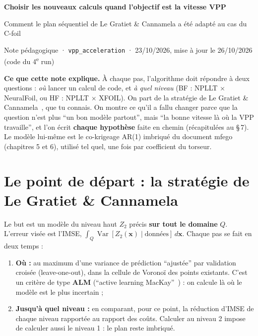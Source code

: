 \documentclass[11pt,a4paper]{article}
\newcommand{\vx}{\bm{x}}
\newcommand{\py}[1]{\texttt{#1}}
\DeclareMathOperator{\Var}{Var}
\begin{document}
{\centering
{\Large\bfseries\color{blue!40!black} Choisir les nouveaux calculs quand l'objectif est la vitesse VPP\par}
\vspace{0.15em}
{\large Comment le plan séquentiel de Le Gratiet \& Cannamela a été adapté au cas du C-foil\par}
\vspace{0.2em}
{\small Note pédagogique · \py{vpp\_acceleration} · 23/10/2026, mise à jour le 26/10/2026 (code du 4\textsuperscript{e} run)\par}}

\vspace{0.4em}
\textbf{Ce que cette note explique.} À chaque pas, l'algorithme doit répondre à deux questions : \emph{où}
lancer un calcul de code, et \emph{à quel niveau} (BF : NPLLT × NeuralFoil, ou HF : NPLLT × XFOIL). On
part de la stratégie de Le Gratiet \& Cannamela~\cite{LGC15}, que tu connais. On montre ce qu'il a fallu
changer parce que la question n'est plus \enquote{un bon modèle partout}, mais \enquote{la bonne vitesse là où
la VPP travaille}, et l'on écrit \textbf{chaque hypothèse} faite en chemin (récapitulées au §\,7). Le modèle
lui-même est le co-krigeage AR(1) imbriqué du document mfego (chapitres 5 et 6), utilisé tel quel, une fois
par coefficient du torseur.

\section{Le point de départ : la stratégie de Le Gratiet \& Cannamela}
\begin{refbox}
Le but est un modèle du niveau haut $Z_2$ précis \textbf{sur tout le domaine} $Q$. L'erreur visée est
l'IMSE, $\int_Q \Var[Z_2(\vx)\mid\text{données}]\,d\vx$. Chaque pas se fait en deux temps :
\begin{enumerate}
  \item \textbf{Où :} au maximum d'une variance de prédiction \enquote{ajustée} par validation croisée
        (leave-one-out), dans la cellule de Voronoï des points existants. C'est un critère de type
        \textbf{ALM} (\enquote{active learning MacKay}~\cite{MacKay92}) : on calcule là où le modèle est le
        plus incertain ;
  \item \textbf{Jusqu'à quel niveau :} en comparant, pour ce point, la réduction d'IMSE de chaque niveau
        rapportée au rapport des coûts. Calculer au niveau 2 impose de calculer aussi le niveau 1 : le plan
        reste imbriqué.
\end{enumerate}
\end{refbox}
\end{document}
